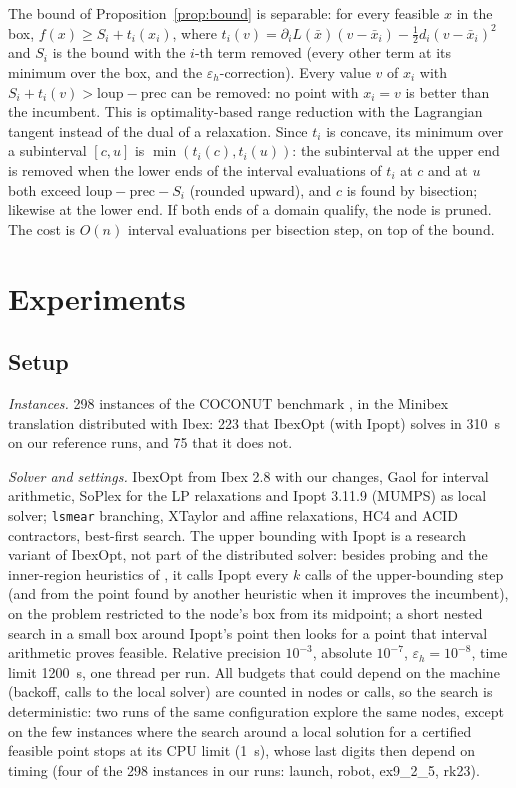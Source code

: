 \documentclass[11pt]{article}
\begin{document}
The bound of Proposition~\ref{prop:bound} is separable: for every feasible $x$ in the
box, $f(x) \ge S_i + t_i(x_i)$, where
$t_i(v) = \partial_i L(\bar x)(v - \bar x_i) - \frac12 d_i (v - \bar x_i)^2$ and $S_i$
is the bound with the $i$-th term removed (every other term at its minimum over the
box, and the $\varepsilon_h$-correction). Every value $v$ of $x_i$ with
$S_i + t_i(v) > \text{loup} - \text{prec}$ can be removed: no point with $x_i = v$ is
better than the incumbent. This is optimality-based range reduction
\citep{RyooSahinidis1996} with the Lagrangian tangent instead of the dual of a
relaxation. Since $t_i$ is concave, its minimum over a subinterval $[c, u]$ is
$\min(t_i(c), t_i(u))$: the subinterval at the upper end is removed when the
lower ends of the interval evaluations of $t_i$ at $c$ and at $u$ both exceed
$\text{loup} - \text{prec} - S_i$ (rounded upward), and $c$ is found by bisection;
likewise at the lower end. If both ends of a domain qualify, the node is pruned. The
cost is $O(n)$ interval evaluations per bisection step, on top of the bound.

\section{Experiments}\label{sec:exp}

\subsection{Setup}

\emph{Instances.} 298 instances of the COCONUT benchmark \citep{Shcherbina2003}, in
the Minibex translation distributed with Ibex: 223 that IbexOpt (with Ipopt) solves in
310~s on our reference runs, and 75 that it does not.

\emph{Solver and settings.} IbexOpt from Ibex 2.8 with our changes, Gaol for interval
arithmetic, SoPlex for the LP relaxations and Ipopt 3.11.9 (MUMPS) as local solver;
\texttt{lsmear} branching, XTaylor and affine relaxations, HC4 and ACID contractors,
best-first search. The upper bounding with Ipopt is a research variant of IbexOpt, not
part of the distributed solver: besides probing and the inner-region heuristics of
\citet{Araya2014}, it calls Ipopt every $k$ calls of the upper-bounding step (and from
the point found by another heuristic when it improves the incumbent), on the problem
restricted to the node's box from its midpoint; a short nested search in a small box
around Ipopt's point then looks for a point that interval arithmetic proves
feasible.
Relative precision $10^{-3}$, absolute $10^{-7}$, $\varepsilon_h = 10^{-8}$, time limit
1200~s, one thread per run. All budgets that could depend on the machine (backoff,
calls to the local solver) are counted in nodes or calls, so the search is
deterministic: two runs of the same configuration explore the same nodes, except on
the few instances where the search around a local solution for a certified feasible
point stops at its CPU limit (1~s), whose last digits then depend on timing (four of the
298 instances in our runs: launch, robot, ex9\_2\_5, rk23).
\end{document}
